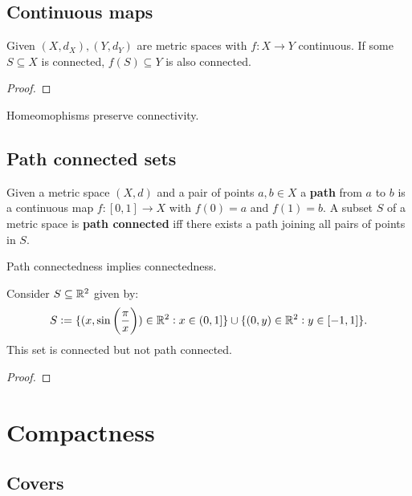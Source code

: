 \documentclass[../Year2.tex]{subfiles}
\begin{document}
\subsection{Continuous maps}

\begin{proposition}
    Given $(X,d_X),(Y,d_Y)$ are metric spaces with $f:X\rightarrow Y$ continuous. If some $S\subseteq X$ is connected, $f(S)\subseteq Y$ is also connected. \begin{proof}
        
    \end{proof}
\end{proposition}

\begin{corollary}
    Homeomophisms preserve connectivity.
\end{corollary}

\subsection{Path connected sets}

\begin{definition}
    Given a metric space $(X,d)$ and a pair of points $a,b\in X$ a \textbf{path} from $a$ to $b$ is a continuous map $f:[0,1]\rightarrow X$ with $f(0)=a$ and $f(1)=b$. A subset $S$ of a metric space is \textbf{path connected} iff there exists a path joining all pairs of points in $S$.
\end{definition}

\begin{theorem}
    Path connectedness implies connectedness.
\end{theorem}

\begin{example}
    Consider $S\subseteq\mathbb{R}^2$ given by: \[
        S := \{(x,\sin\br{\frac{\pi}{x}})\in\RR^2: x\in(0,1]\} \cup \{(0,y)\in\RR^2: y\in[-1,1]\}
        \black{.}
    \] This set is connected but not path connected. \begin{proof}
        
    \end{proof}
\end{example}

\section{Compactness}

\subsection{Covers}
\end{document}
